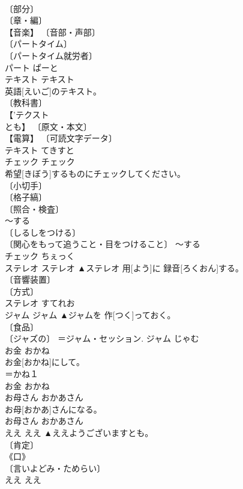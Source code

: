\documentclass[8pt]{extreport}
\begin{document}
\begin{CJK}{UTF8}{min}
\\	〔部分〕 
\\	〔章・編〕 
\\	【音楽】 〔音部・声部〕 
\\	〔パートタイム〕 
\\	〔パートタイム就労者〕 
\\	パート	ぱーと	
\\	テキスト	テキスト	
\\	英語[えいご]のテキスト。	
\\	〔教科書〕 
\\	【'テクスト
\\	とも】 〔原文・本文〕 
\\	【電算】 〔可読文字データ〕 
\\	テキスト	てきすと	
\\	チェック	チェック	
\\	希望[きぼう]するものにチェックしてください。	
\\	〔小切手〕 
\\	〔格子縞〕 
\\	〔照合・検査〕 
\\	～する 
\\	〔しるしをつける〕 
\\	〔関心をもって追うこと・目をつけること〕 ～する 
\\	チェック	ちぇっく	
\\	ステレオ	ステレオ	▲ステレオ 用[よう]に 録音[ろくおん]する。	
\\	〔音響装置〕 
\\	〔方式〕 
\\	ステレオ	すてれお	
\\	ジャム	ジャム	▲ジャムを 作[つく]っておく。	
\\	〔食品〕 
\\	〔ジャズの〕 ＝ジャム・セッション.	ジャム	じゃむ	
\\	お金	おかね	
\\	お金[おかね]にして。	
\\	＝かね１ 
\\	お金	おかね	
\\	お母さん	おかあさん	
\\	お母[おかあ]さんになる。	
\\	お母さん	おかあさん	
\\	ええ	ええ	▲ええようございますとも。	
\\	〔肯定〕 
\\	《口》 
\\	〔言いよどみ・ためらい〕 
\\	[⇒ええっ, ええと]	ええ	ええ	

\end{CJK}
\end{document}
